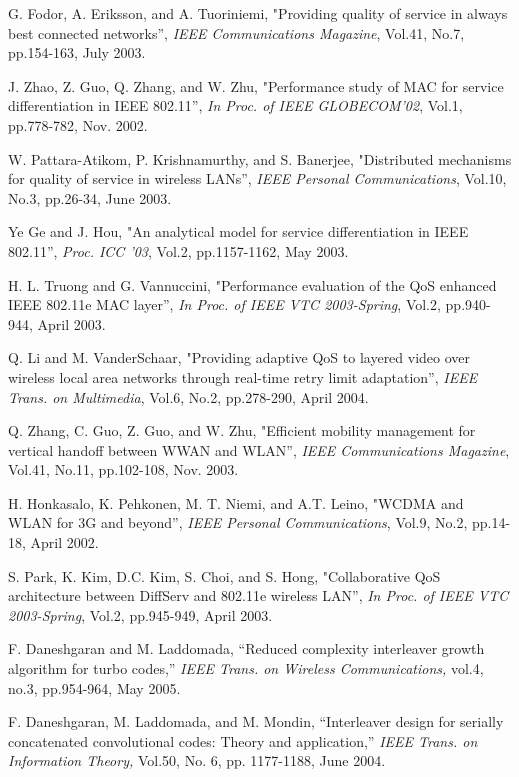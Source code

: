 \documentclass[10pt,onecolumn,a4paper]{IEEEtran}
\begin{document}
\begin{thebibliography}{99}
G. Fodor, A. Eriksson, and A. Tuoriniemi, "Providing quality of
service in always best connected networks'', {\em IEEE
Communications Magazine}, Vol.41, No.7, pp.154-163, July 2003.

J. Zhao, Z. Guo, Q. Zhang, and W. Zhu, "Performance study of MAC
for service differentiation in IEEE 802.11'', {\em In Proc. of
IEEE GLOBECOM'02}, Vol.1, pp.778-782, Nov. 2002.

W. Pattara-Atikom, P. Krishnamurthy, and S. Banerjee, "Distributed
mechanisms for quality of service in wireless LANs'', {\em IEEE
Personal Communications}, Vol.10, No.3, pp.26-34, June 2003.

Ye Ge and J. Hou, "An analytical model for service differentiation
in IEEE 802.11'', {\em Proc. ICC '03}, Vol.2, pp.1157-1162, May
2003.

H. L. Truong and G. Vannuccini, "Performance evaluation of the QoS
enhanced IEEE 802.11e MAC layer'', {\em In Proc. of IEEE VTC
2003-Spring}, Vol.2, pp.940-944, April 2003.

Q. Li and M. VanderSchaar, "Providing adaptive QoS to layered
video over wireless local area networks through real-time retry
limit adaptation'', {\em IEEE Trans. on Multimedia}, Vol.6, No.2,
pp.278-290, April 2004.

Q. Zhang, C. Guo, Z. Guo, and W. Zhu, "Efficient mobility
management for vertical handoff between WWAN and WLAN'', {\em IEEE
Communications Magazine}, Vol.41, No.11, pp.102-108, Nov. 2003.

H. Honkasalo, K. Pehkonen, M. T. Niemi, and A.T. Leino, "WCDMA and
WLAN for 3G and beyond'', {\em IEEE Personal Communications},
Vol.9, No.2, pp.14-18, April 2002.


S. Park, K. Kim, D.C. Kim, S. Choi, and S. Hong, "Collaborative
QoS architecture between DiffServ and 802.11e wireless LAN'', {\em
In Proc. of IEEE VTC 2003-Spring}, Vol.2, pp.945-949, April 2003.

 F. Daneshgaran and M. Laddomada,
``Reduced complexity interleaver growth algorithm for turbo
codes,'' {\sl IEEE Trans. on Wireless Communications,} vol.4,
no.3, pp.954-964, May 2005.

 F. Daneshgaran, M. Laddomada, and M. Mondin,
``Interleaver design for serially concatenated convolutional
codes: Theory and application,'' {\sl IEEE Trans. on Information
Theory,} Vol.50, No. 6, pp. 1177-1188, June 2004.



\end{thebibliography}
\end{document}
